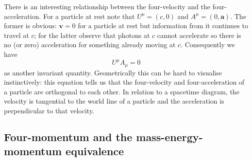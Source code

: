 \documentclass[english,seminar]{lecture}
\begin{document}
There is an interesting relationship between the four-velocity and the four-acceleration. For a particle at rest note that $U^\mu = (c,0)$ and $A^\mu = (0,\mathbf{a})$. The former is obvious: $\mathbf{v}= 0$ for a particle at rest but information from it continues to travel at $c$; for the latter observe that photons at $c$ cannot accelerate so there is no (or zero) acceleration for something already moving at $c$. Consequently we have
\begin{equation}
	U^\mu A_\mu = 0 \label{eq:UA-invariance}
\end{equation}
as another invariant quantity. Geometrically this can be hard to visualise instinctively: this equation tells us that the four-velocity and four-acceleration of a particle are orthogonal to each other. In relation to a spacetime diagram, the velocity is tangential to the world line of a particle and the acceleration is perpendicular to that velocity.

\subsection{Four-momentum and the mass-energy-momentum equivalence}
\end{document}
